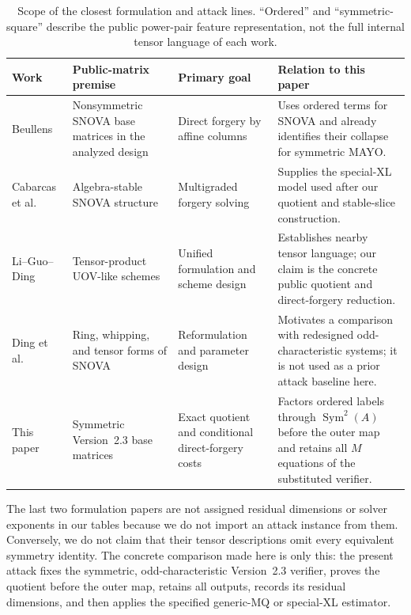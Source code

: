 \documentclass[11pt]{article}
\newcommand{\Sym}{\operatorname{Sym}}
\newcommand{\SNOVA}{\textsf{SNOVA}}
\begin{document}
\begin{table}[tbp]
\centering
\caption{Scope of the closest formulation and attack lines.  ``Ordered'' and
``symmetric-square'' describe the public power-pair feature representation,
not the full internal tensor language of each work.}
\label{tab:related-scope}
\scriptsize
\setlength{\tabcolsep}{3.8pt}
\begin{tabularx}{0.97\textwidth}{@{}
>{\raggedright\arraybackslash}p{}
>{\raggedright\arraybackslash}p{}
>{\raggedright\arraybackslash}p{}
>{\raggedright\arraybackslash}X@{}}
\toprule
Work & Public-matrix premise & Primary goal & Relation to this paper\\
\midrule
Beullens~\cite{Beullens2024SNOVA} & Nonsymmetric \SNOVA{} base matrices in the
analyzed design & Direct forgery by affine columns & Uses ordered terms for
\SNOVA{} and already identifies their collapse for symmetric MAYO.\\
Cabarcas et al.~\cite{Cabarcas2025SNOVA} & Algebra-stable \SNOVA{} structure &
Multigraded forgery solving & Supplies the special-XL model used after our
quotient and stable-slice construction.\\
Li--Guo--Ding~\cite{LiGuoDing2025Unified} & Tensor-product UOV-like schemes &
Unified formulation and scheme design & Establishes nearby tensor language;
our claim is the concrete public quotient and direct-forgery reduction.\\
Ding et al.~\cite{DingEtAl2026Reformulating} & Ring, whipping, and tensor
forms of \SNOVA{} & Reformulation and parameter design & Motivates a
comparison with redesigned odd-characteristic systems; it is not used as a
prior attack baseline here.\\
This paper & Symmetric Version~2.3 base matrices & Exact quotient and
conditional direct-forgery costs & Factors ordered labels through
$\Sym^2(A)$ before the outer map and retains all $M$ equations of the
substituted verifier.\\
\bottomrule
\end{tabularx}
\end{table}

The last two formulation papers are not assigned residual dimensions or
solver exponents in our tables because we do not import an attack instance
from them.  Conversely, we do not claim that their tensor descriptions omit
every equivalent symmetry identity.  The concrete comparison made here is
only this: the present attack fixes the symmetric, odd-characteristic
Version~2.3 verifier, proves the quotient before the outer map, retains all
outputs, records its residual dimensions, and then applies the specified
generic-MQ or special-XL estimator.
\end{document}
